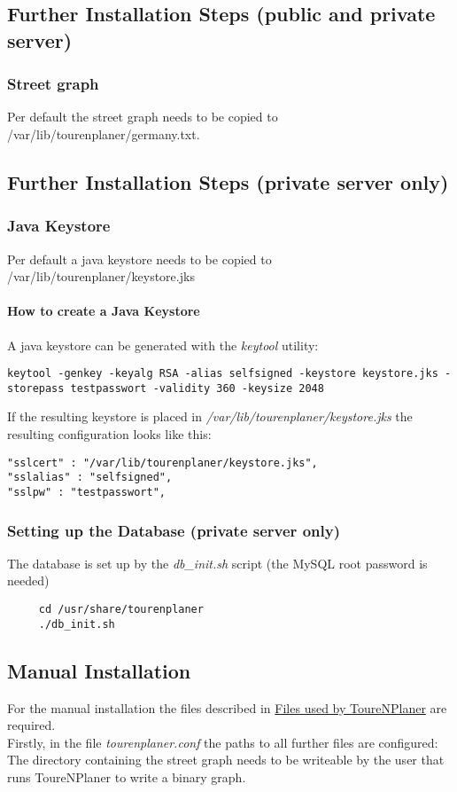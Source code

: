 \documentclass[ngerman,titlepage,parskip=true]{scrartcl}
\begin{document}
	\subsection{Further Installation Steps  (public and private server)}
	\subsubsection{Street graph}
	 Per default the street graph needs to be copied to /var/lib/tourenplaner/germany.txt.
	\subsection{Further Installation Steps (private server only)}
	 \subsubsection{Java Keystore}
	 Per default a java keystore needs to be copied to /var/lib/tourenplaner/keystore.jks
	 \paragraph{How to create a Java Keystore}
	 A java keystore can be generated with the \textit{keytool} utility:
	 	\begin{lstlisting}
keytool -genkey -keyalg RSA -alias selfsigned -keystore keystore.jks -storepass testpasswort -validity 360 -keysize 2048
		\end{lstlisting}
		If the resulting keystore is placed in \textit{/var/lib/tourenplaner/keystore.jks} the resulting configuration looks like this:
	 	\begin{lstlisting}
"sslcert" : "/var/lib/tourenplaner/keystore.jks",
"sslalias" : "selfsigned",
"sslpw" : "testpasswort",
 		\end{lstlisting}
	 \subsubsection{Setting up the Database (private server only)}
	The database is set up by the \textit{db\_init.sh} script (the MySQL root password is needed)
   \begin{lstlisting}
	 cd /usr/share/tourenplaner
	 ./db_init.sh
	\end{lstlisting}
	
  \subsection{Manual Installation}
	For the manual installation the files described in \hyperref[usedfiles]{Files used by ToureNPlaner} are required.\\
	Firstly, in the file \textit{tourenplaner.conf} the paths to all further files are configured: The directory containing the street graph needs to be writeable by the user that runs ToureNPlaner to write a binary graph.
\end{document}
